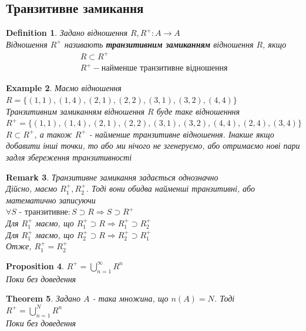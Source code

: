 \documentclass[a4paper, 14pt]{extarticle}
\def\huge{\displaystyle}
\theoremstyle{theoremdd}
\newtheorem{theorem}{Theorem}[subsection]
\theoremstyle{theoremdd}
\newtheorem{definition}[theorem]{Definition}
\theoremstyle{theoremdd}
\theoremstyle{theoremdd}
\newtheorem{example}[theorem]{Example}
\theoremstyle{theoremdd}
\newtheorem{proposition}[theorem]{Proposition}
\theoremstyle{theoremdd}
\newtheorem{remark}[theorem]{Remark}
\theoremstyle{theoremdd}
\theoremstyle{theoremdd}
\begin{document}
\subsection{Транзитивне замикання}
\begin{definition}
Задано відношення $R, R^+: A \to A$\\
Відношення $R^+$ називають \textbf{транзитивним замиканням} відношення $R$, якщо
\begin{align*}
R \subset R^+ \\
R^+ - \text{найменше транзитивне відношення}
\end{align*}
\end{definition}

\begin{example}
Маємо відношення \\ $R = \{(1,1),(1,4),(2,1),(2,2),(3,1),(3,2),(4,4)\}$\\
Транзитивним замиканням відношення $R$ буде таке відношенння\\
$R^+ = \{(1,1),(1,4),(2,1),(2,2),(3,1),(3,2),(4,4),(2,4),(3,4)\}$\\
$R \subset R^+$, а також $R^+$ - найменше транзитивне відношення. Інакше якщо добавити інші точки, то або ми нічого не згенеруємо, або отримаємо нові пари задля збереження транзитивності
\end{example}

\begin{remark}
Транзитивне замикання задається однозначно\\
Дійсно, маємо $R_1^+, R_2^+$. Тоді вони обидва найменші транзитивні, або математично записуючи\\
$\forall S \text{ - транзитивне}: S \supset R \Rightarrow S \supset R^+$\\
Для $R_1^+$ маємо, що $R_1^+ \supset R \Rightarrow R_1^+ \supset R_2^+$\\
Для $R_1^+$ маємо, що $R_2^+ \supset R \Rightarrow R_2^+ \supset R_1^+$\\
Отже, $R_1^+ = R_2^+$
\end{remark}

\begin{proposition}
$R^+ = \huge \bigcup_{n=1}^\infty R^n$\\
\textit{Поки без доведення}
\end{proposition}

\begin{theorem}
Задано $A$ - така множина, що $n(A) = N$. Тоді\\
$R^+ = \huge \bigcup_{n=1}^N R^n$\\
\textit{Поки без доведення}
\end{theorem}
\end{document}
